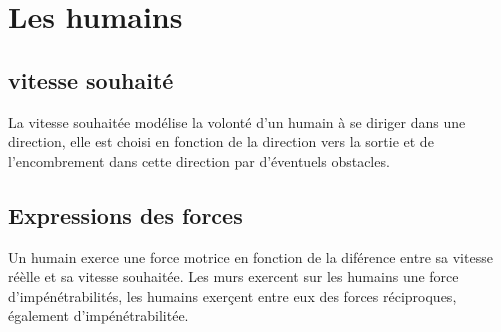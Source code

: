 \section{Les humains}
%
\subsection{vitesse souhaité}
La vitesse souhaitée modélise la volonté d'un humain à se diriger dans une direction, elle est choisi en fonction de la direction vers la sortie et de l'encombrement dans cette direction par d'éventuels obstacles.
%
\subsection{Expressions des forces}
Un humain exerce une force motrice en fonction de la diférence entre sa vitesse réèlle et sa vitesse souhaitée. Les murs exercent sur les humains une force d'impénétrabilités, les humains exerçent entre eux des forces réciproques, également d'impénétrabilitée.
